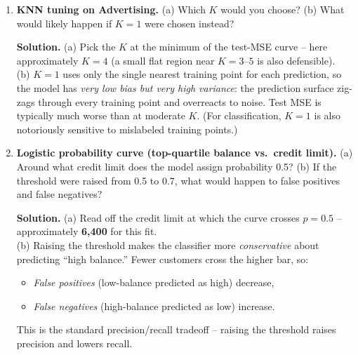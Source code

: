 \documentclass[11pt]{article}
\newcommand{\solution}[1]{%
  \par\medskip\noindent\textbf{Solution.} #1\par\medskip
}
\begin{document}
\begin{enumerate}[leftmargin=*]
\solution{(a) Test MSE is minimized at about polynomial degree \textbf{3} (you would also accept degree 2 if the curves are essentially flat between them; the key point is that the minimum is at low degree). Beyond that, test MSE flattens or rises.\\
(b) Training MSE is monotonically non-increasing in degree because higher-degree polynomials are \emph{nested}: anything a degree-3 polynomial can fit, a degree-4 polynomial can fit at least as well (just zero out the new coefficient). So training error must weakly decrease as flexibility grows -- but the extra flexibility past degree 3 is fitting noise, not signal, so test error stops improving.}

\item \textbf{KNN tuning on Advertising.} (a) Which $K$ would you choose? (b) What would likely happen if $K=1$ were chosen instead?

\solution{(a) Pick the $K$ at the minimum of the test-MSE curve -- here approximately $K = 4$ (a small flat region near $K = 3$--$5$ is also defensible).\\
(b) $K = 1$ uses only the single nearest training point for each prediction, so the model has \emph{very low bias but very high variance}: the prediction surface zig-zags through every training point and overreacts to noise. Test MSE is typically much worse than at moderate $K$. (For classification, $K = 1$ is also notoriously sensitive to mislabeled training points.)}

\item \textbf{Logistic probability curve (top-quartile balance vs.~credit limit).} (a) Around what credit limit does the model assign probability 0.5? (b) If the threshold were raised from 0.5 to 0.7, what would happen to false positives and false negatives?

\solution{(a) Read off the credit limit at which the curve crosses $p = 0.5$ -- approximately \textbf{6{,}400} for this fit.\\
(b) Raising the threshold makes the classifier more \emph{conservative} about predicting ``high balance.'' Fewer customers cross the higher bar, so:
\begin{itemize}
\item \emph{False positives} (low-balance predicted as high) decrease,
\item \emph{False negatives} (high-balance predicted as low) increase.
\end{itemize}
This is the standard precision/recall tradeoff -- raising the threshold raises precision and lowers recall.}


\end{enumerate}
\end{document}
